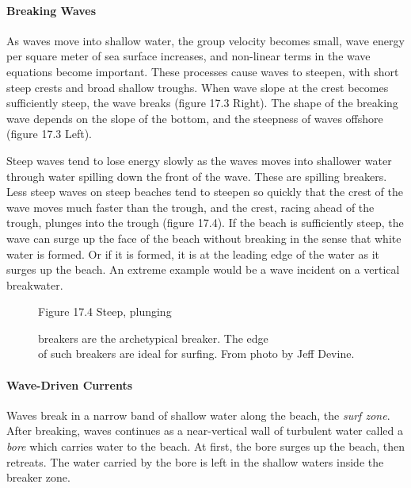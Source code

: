\paragraph{Breaking Waves}
As waves move into shallow water, the group velocity becomes small, wave energy per square meter of sea surface increases, and non-linear terms in the wave equations become important. These processes cause waves to steepen, with
short steep crests and broad shallow troughs. When wave slope at the crest becomes sufficiently steep, the wave breaks (figure 17.3 Right). The shape of the breaking wave depends on the slope of the bottom, and the steepness of waves offshore (figure 17.3 Left).
\begin{enumerate}
\vitem
Steep waves tend to lose energy slowly as the waves moves into shallower water through water spilling down the front of the wave. These are spilling breakers.
\vitem
Less steep waves on steep beaches tend to steepen so quickly that the crest of the wave moves much faster than the trough, and the crest, racing ahead of the trough, plunges into the trough (figure 17.4).
\vitem
If the beach is sufficiently steep, the wave can surge up the face of the beach without breaking in the sense that white water is formed. Or if it is formed, it is at the leading edge of the water as it surges up the beach. An extreme example would be a wave incident on a vertical breakwater.
\end{enumerate}

\begin{figure}[t!]
\centering
\footnotesize
Figure 17.4 Steep, plunging \rule{0pt}{4ex}breakers are the archetypical breaker. The edge\\of such breakers are ideal for surfing. From photo by Jeff Devine.

\label{fig:wavecropped}
\vspace{-3ex}
\end{figure}

\paragraph{Wave-Driven Currents}
Waves break in a narrow band of shallow water along the beach, the \textit{surf zone}. After breaking, waves continues as a near-vertical wall of turbulent water called a \textit{bore} which carries water to the beach. At first, the bore surges up the beach, then retreats. The water carried by the bore is left in the shallow waters inside the breaker zone.

